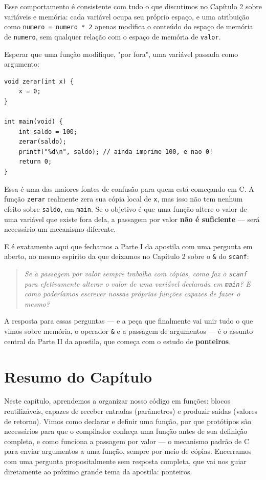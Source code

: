 \documentclass[12pt,a4paper,oneside]{extreport}
\begin{document}
Esse comportamento é consistente com tudo o que discutimos no Capítulo 2 sobre variáveis e memória: cada variável ocupa seu próprio espaço, e uma atribuição como \texttt{numero = numero * 2} apenas modifica o conteúdo do espaço de memória de \texttt{numero}, sem qualquer relação com o espaço de memória de \texttt{valor}.

\begin{errocomum}
Esperar que uma função modifique, "por fora", uma variável passada como argumento:
\begin{lstlisting}
void zerar(int x) {
    x = 0;
}

int main(void) {
    int saldo = 100;
    zerar(saldo);
    printf("%d\n", saldo); // ainda imprime 100, e nao 0!
    return 0;
}
\end{lstlisting}
Essa é uma das maiores fontes de confusão para quem está começando em C. A função \texttt{zerar} realmente zera sua cópia local de \texttt{x}, mas isso não tem nenhum efeito sobre \texttt{saldo}, em \texttt{main}. Se o objetivo é que uma função altere o valor de uma variável que existe fora dela, a passagem por valor \textbf{não é suficiente} — será necessário um mecanismo diferente.
\end{errocomum}

E é exatamente aqui que fechamos a Parte I da apostila com uma pergunta em aberto, no mesmo espírito da que deixamos no Capítulo 2 sobre o \texttt{\&} do \texttt{scanf}:

\begin{quote}
\textit{Se a passagem por valor sempre trabalha com cópias, como faz o \texttt{scanf} para efetivamente alterar o valor de uma variável declarada em \texttt{main}? E como poderíamos escrever nossas próprias funções capazes de fazer o mesmo?}
\end{quote}

A resposta para essas perguntas — e a peça que finalmente vai unir tudo o que vimos sobre memória, o operador \texttt{\&} e a passagem de argumentos — é o assunto central da Parte II da apostila, que começa com o estudo de \textbf{ponteiros}.

\section*{Resumo do Capítulo}
Neste capítulo, aprendemos a organizar nosso código em funções: blocos reutilizáveis, capazes de receber entradas (parâmetros) e produzir saídas (valores de retorno). Vimos como declarar e definir uma função, por que protótipos são necessários para que o compilador conheça uma função antes de sua definição completa, e como funciona a passagem por valor — o mecanismo padrão de C para enviar argumentos a uma função, sempre por meio de cópias. Encerramos com uma pergunta propositalmente sem resposta completa, que vai nos guiar diretamente ao próximo grande tema da apostila: ponteiros.
\end{document}
